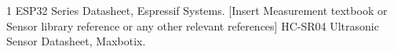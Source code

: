 \begin{thebibliography}{1}
ESP32 Series Datasheet, Espressif Systems.
[Insert Measurement textbook or Sensor library reference or any other relevant references]
HC-SR04 Ultrasonic Sensor Datasheet, Maxbotix.
\end{thebibliography}
